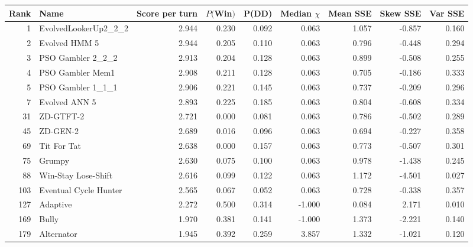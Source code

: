\begin{tabular}{rlrrrrrrr}
\toprule
 Rank &                   Name &  Score per turn &  $P($Win$)$ &  P(DD) &  Median $\chi$ &  Mean SSE &  Skew SSE &  Var SSE \\
\midrule
    1 &   EvolvedLookerUp2\_2\_2 &           2.944 &       0.230 &  0.092 &          0.063 &     1.057 &    -0.857 &    0.160 \\
    2 &          Evolved HMM 5 &           2.944 &       0.205 &  0.110 &          0.063 &     0.796 &    -0.448 &    0.294 \\
    3 &      PSO Gambler 2\_2\_2 &           2.913 &       0.204 &  0.128 &          0.063 &     0.899 &    -0.508 &    0.255 \\
    4 &       PSO Gambler Mem1 &           2.908 &       0.211 &  0.128 &          0.063 &     0.705 &    -0.186 &    0.333 \\
    5 &      PSO Gambler 1\_1\_1 &           2.906 &       0.221 &  0.145 &          0.063 &     0.737 &    -0.209 &    0.296 \\
    7 &          Evolved ANN 5 &           2.893 &       0.225 &  0.185 &          0.063 &     0.804 &    -0.608 &    0.334 \\
   31 &              ZD-GTFT-2 &           2.721 &       0.000 &  0.081 &          0.063 &     0.786 &    -0.502 &    0.289 \\
   45 &               ZD-GEN-2 &           2.689 &       0.016 &  0.096 &          0.063 &     0.694 &    -0.227 &    0.358 \\
   69 &            Tit For Tat &           2.638 &       0.000 &  0.157 &          0.063 &     0.773 &    -0.507 &    0.301 \\
   75 &                 Grumpy &           2.630 &       0.075 &  0.100 &          0.063 &     0.978 &    -1.438 &    0.245 \\
   88 &    Win-Stay Lose-Shift &           2.616 &       0.099 &  0.122 &          0.063 &     1.172 &    -4.501 &    0.027 \\
  103 &  Eventual Cycle Hunter &           2.565 &       0.067 &  0.052 &          0.063 &     0.728 &    -0.338 &    0.357 \\
  127 &               Adaptive &           2.272 &       0.500 &  0.314 &         -1.000 &     0.084 &     2.171 &    0.010 \\
  169 &                  Bully &           1.970 &       0.381 &  0.141 &         -1.000 &     1.373 &    -2.221 &    0.140 \\
  179 &             Alternator &           1.945 &       0.392 &  0.259 &          3.857 &     1.332 &    -1.021 &    0.120 \\

\end{tabular}
